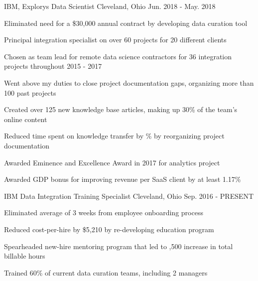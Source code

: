 \begin{cventries}
  \cventry
    {IBM, Explorys} %
    {Data Scientist} %
    {Cleveland, Ohio} %
    {Jun. 2018 - May. 2018} %
    {
      \begin{cvitems} %
        \item {Eliminated need for a \$30,000 annual contract by developing data curation tool}
        \item {Principal integration specialist on over 60 projects for 20 different clients}
        \item {Chosen as team lead for  remote data science contractors for 36 integration projects throughout 2015 - 2017}
        \item {Went above my duties to close project documentation gaps, organizing more than 100 past projects}
        \item {Created over 125 new knowledge base articles, making up 30\% of the team's online content}
        \item {Reduced time spent on knowledge transfer by \% by reorganizing project documentation}
        \item {Awarded Eminence and Excellence Award in 2017 for analytics project}
        \item {Awarded GDP bonus for improving revenue per SaaS client by at least 1.17\%}
      \end{cvitems}
    }

  \cventry
    {IBM} %
    {Data Integration Training Specialist} %
    {Cleveland, Ohio} %
    {Sep. 2016 - PRESENT} %
    {
      \begin{cvitems} %
        \item {Eliminated average of 3 weeks from employee onboarding process}
        \item {Reduced cost-per-hire by \$5,210 by re-developing education program}
        \item {Spearheaded new-hire mentoring program that led to ,500 increase in total billable hours}
        \item {Trained 60\% of current data curation teams, including 2 managers}
      \end{cvitems}
    }


\end{cventries}
